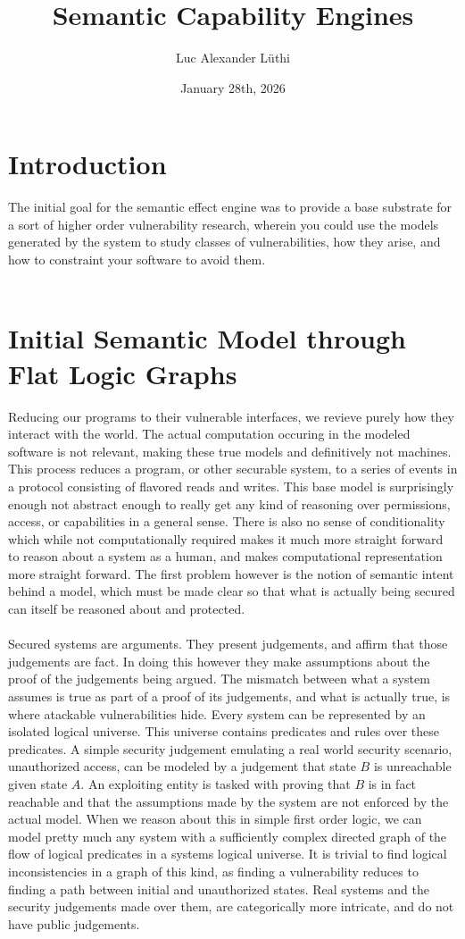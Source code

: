 \documentclass{article}
\title{Semantic Capability Engines}
\author{Luc Alexander L{\"u}thi}
\date{January 28th, 2026}
\begin{document}
	\maketitle
	\tableofcontents
	\section{Introduction}
	The initial goal for the semantic effect engine was to provide a base substrate for a sort of higher order vulnerability research, wherein you could use the models generated by the system to study classes of vulnerabilities, how they arise, and how to constraint your software to avoid them.\\\\
	\section{Initial Semantic Model through Flat Logic Graphs}
	Reducing our programs to their vulnerable interfaces, we revieve purely how they interact with the world. The actual computation occuring in the modeled software is not relevant, making these true models and definitively not machines. This process reduces a program, or other securable system, to a series of events in a protocol consisting of flavored reads and writes. This base model is surprisingly enough not abstract enough to really get any kind of reasoning over permissions, access, or capabilities in a general sense. There is also no sense of conditionality which while not computationally required makes it much more straight forward to reason about a system as a human, and makes computational representation more straight forward. The first problem however is the notion of semantic intent behind a model, which must be made clear so that what is actually being secured can itself be reasoned about and protected.\\\\
	Secured systems are arguments. They present judgements, and affirm that those judgements are fact. In doing this however they make assumptions about the proof of the judgements being argued. The mismatch between what a system assumes is true as part of a proof of its judgements, and what is actually true, is where atackable vulnerabilities hide. Every system can be represented by an isolated logical universe. This universe contains predicates and rules over these predicates. A simple security judgement emulating a real world security scenario, unauthorized access, can be modeled by a judgement that state $B$ is unreachable given state $A$. An exploiting entity is tasked with proving that $B$ is in fact reachable and that the assumptions made by the system are not enforced by the actual model. When we reason about this in simple first order logic, we can model pretty much any system with a sufficiently complex directed graph of the flow of logical predicates in a systems logical universe. It is trivial to find logical inconsistencies in a graph of this kind, as finding a vulnerability reduces to finding a path between initial and unauthorized states. Real systems and the security judgements made over them, are categorically more intricate, and do not have public judgements.\\\\
\end{document}
